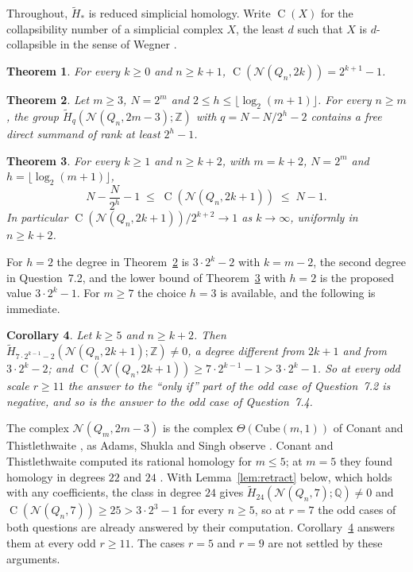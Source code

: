 \documentclass[11pt]{amsart}
\newtheorem{theorem}{Theorem}[section]
\newtheorem{corollary}[theorem]{Corollary}
\theoremstyle{definition}
\theoremstyle{remark}
\newcommand{\N}{\mathcal{N}}
\newcommand{\Q}{Q}
\newcommand{\Z}{\mathbb{Z}}
\newcommand{\Hred}{\widetilde{H}}
\newcommand{\C}{\operatorname{C}}
\begin{document}
Throughout, $\Hred_*$ is reduced simplicial homology. Write $\C(X)$ for the collapsibility number of a simplicial
complex $X$, the least $d$ such that $X$ is $d$-collapsible
in the sense of Wegner \cite{W}.

\begin{theorem}\label{thm:even}
For every $k\ge0$ and $n\ge k+1$, $\C(\N(\Q_n,2k))=2^{k+1}-1$.
\end{theorem}

\begin{theorem}\label{thm:rank}
Let $m\ge3$, $N=2^m$ and $2\le h\le\lfloor\log_2(m+1)\rfloor$. For every $n\ge m$, the group
$\Hred_{q}(\N(\Q_n,2m-3);\Z)$ with $q=N-N/2^h-2$ contains a free direct summand of rank at least $2^h-1$.
\end{theorem}

\begin{theorem}\label{thm:odd}
For every $k\ge1$ and $n\ge k+2$, with $m=k+2$, $N=2^m$ and $h=\lfloor\log_2(m+1)\rfloor$,
\[
N-\frac{N}{2^h}-1\;\le\;\C(\N(\Q_n,2k+1))\;\le\;N-1 .
\]
In particular $\C(\N(\Q_n,2k+1))/2^{k+2}\to1$ as $k\to\infty$, uniformly in $n\ge k+2$.
\end{theorem}

For $h=2$ the degree in Theorem~\ref{thm:rank} is $3\cdot2^k-2$ with $k=m-2$, the second degree in Question~7.2, and the
lower bound of Theorem~\ref{thm:odd} with $h=2$ is the proposed value $3\cdot2^k-1$. For $m\ge7$ the choice $h=3$ is
available, and the following is immediate.

\begin{corollary}\label{cor:questions}
Let $k\ge5$ and $n\ge k+2$. Then $\Hred_{7\cdot2^{k-1}-2}(\N(\Q_n,2k+1);\Z)\ne0$, a degree different from $2k+1$ and from
$3\cdot2^k-2$; and $\C(\N(\Q_n,2k+1))\ge7\cdot2^{k-1}-1>3\cdot2^k-1$. So at every odd scale $r\ge11$ the answer to the
``only if'' part of the odd case of Question~7.2 is negative, and so is the answer to the odd case of Question~7.4.
\end{corollary}

The complex $\N(\Q_m,2m-3)$ is the complex $\Theta(\mathrm{Cube}(m,1))$ of Conant and Thistlethwaite \cite{CT}, as
Adams, Shukla and Singh observe \cite{ASS}. Conant and Thistlethwaite computed its rational homology for $m\le5$; at
$m=5$ they found homology in degrees $22$ and $24$ \cite[Theorem~5]{CT}. With Lemma~\ref{lem:retract} below, which holds
with any coefficients, the class in degree $24$ gives $\Hred_{24}(\N(\Q_n,7);\mathbb{Q})\ne0$ and $\C(\N(\Q_n,7))\ge25>3\cdot2^3-1$ for every $n\ge5$, so at $r=7$ the
odd cases of both questions are already answered by their computation. Corollary~\ref{cor:questions} answers them at
every odd $r\ge11$. The cases $r=5$ and $r=9$ are not settled by these arguments.
\end{document}
